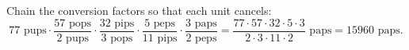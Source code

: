 Chain the conversion factors so that each unit cancels:
\[77\text{ pups}\cdot\dfrac{57\text{ pops}}{2\text{ pups}}\cdot\dfrac{32\text{ pips}}{3\text{ pops}}\cdot\dfrac{5\text{ peps}}{11\text{ pips}}\cdot\dfrac{3\text{ paps}}{2\text{ peps}}=\dfrac{77\cdot57\cdot32\cdot5\cdot3}{2\cdot3\cdot11\cdot2}\text{ paps}=\boxed{15960}\text{ paps}.\]
